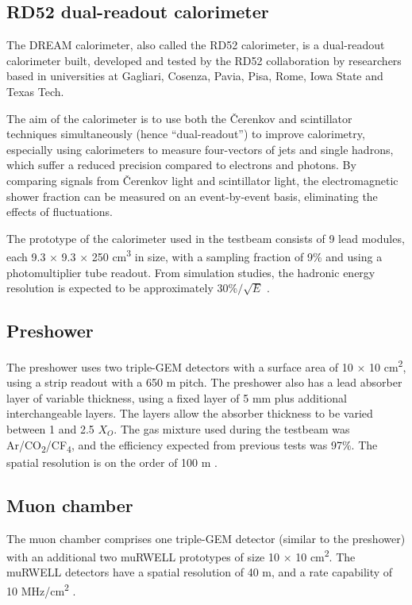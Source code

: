 \subsection{RD52 dual-readout calorimeter} %
The \acrfull{DREAM} calorimeter, also called the RD52 calorimeter, is a dual-readout calorimeter built, developed and tested by the RD52 collaboration by researchers based in universities at Gagliari, Cosenza, Pavia, Pisa, Rome, Iowa State and Texas Tech. 

The aim of the calorimeter is to use both the \v{C}erenkov and scintillator techniques simultaneously (hence ``dual-readout'') to improve calorimetry, especially using calorimeters to measure four-vectors of jets and single hadrons, which suffer a reduced precision compared to electrons and photons. By comparing signals from \v{C}erenkov light and scintillator light, the electromagnetic shower fraction can be measured on an event-by-event basis, eliminating the effects of fluctuations. %

The prototype of the calorimeter used in the testbeam consists of 9 lead modules, each 9.3 $\times$ 9.3 $\times$ 250 cm\textsuperscript{3} in size, with a sampling fraction of 9\% and using a photomultiplier tube readout. From simulation studies, the hadronic energy resolution is expected to be approximately 30\%$/\sqrt{E}$ \cite{idea-dual-readout} \cite{idea-rd52}.

\subsection{Preshower}
The preshower uses two triple-GEM detectors with a surface area of 10 $\times$ 10 cm\textsuperscript{2}, using a strip readout with a 650 \textmu m pitch. The preshower also has a lead absorber layer of variable thickness, using a fixed layer of 5 mm plus additional interchangeable layers. The layers allow the absorber thickness to be varied between 1 and 2.5 $X_O$. The gas mixture used during the testbeam was Ar/CO\textsubscript{2}/CF\textsubscript{4}, and the efficiency expected from previous tests was 97\%. The spatial resolution is on the order of 100 \textmu m \cite{idea-gem}.

\subsection{Muon chamber}
The muon chamber comprises one triple-GEM detector (similar to the preshower) with an additional two \acrshort{muRWELL} prototypes of size 10 $\times$ 10 cm\textsuperscript{2}. The \acrshort{muRWELL} detectors have a spatial resolution of 40 \textmu m, and a rate capability of 10 MHz/cm\textsuperscript{2} \cite{idea-micro-rwell}.

